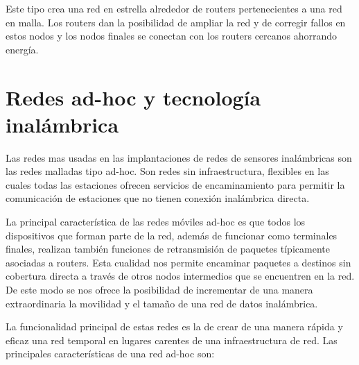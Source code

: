  Este tipo crea una red en estrella alrededor de routers pertenecientes a una red en malla. Los routers dan la
posibilidad de ampliar la red y de corregir fallos en estos nodos y los nodos finales se conectan con los routers
cercanos ahorrando energ\'ia.

\section {Redes ad-hoc y tecnolog\'ia inal\'ambrica} 

Las redes mas usadas en las implantaciones de redes de sensores inal\'ambricas son las redes malladas tipo ad-hoc. Son redes sin infraestructura, flexibles en las cuales todas las estaciones ofrecen servicios de encaminamiento para permitir la comunicaci\'on de estaciones que no tienen conexi\'on inal\'ambrica directa.

La principal caracter\'istica de las redes m\'oviles ad-hoc es que todos los dispositivos que forman parte de la red, adem\'as de funcionar como terminales finales, realizan tambi\'en funciones de retransmisi\'on de paquetes t\'ipicamente asociadas a routers. Esta cualidad nos permite encaminar paquetes a destinos sin cobertura directa a trav\'es de otros nodos intermedios que se encuentren en la red. De este modo se nos ofrece la posibilidad de incrementar de una manera extraordinaria la movilidad y el tama\~no de una red de datos inal\'ambrica. 

La funcionalidad principal de estas redes es la de crear de una manera r\'apida y eficaz una red temporal en lugares carentes de una infraestructura de red. Las principales caracter\'isticas de una red ad-hoc son: 

